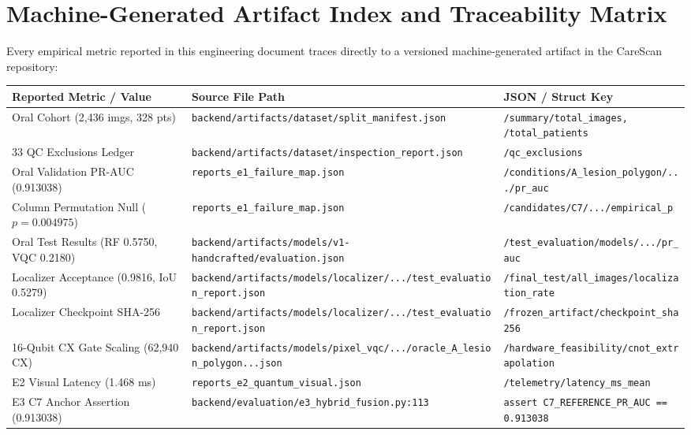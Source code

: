 \documentclass[11pt,a4paper]{report}
\newcommand{\artifact}[1]{\texttt{\footnotesize #1}}
\begin{document}
\chapter{Machine-Generated Artifact Index and Traceability Matrix}

Every empirical metric reported in this engineering document traces directly to a versioned machine-generated artifact in the CareScan repository:

\begin{table}[H]
\centering
\scriptsize
\begin{tabularx}{\textwidth}{llX}
\toprule
\textbf{Reported Metric / Value} & \textbf{Source File Path} & \textbf{JSON / Struct Key} \\
\midrule
Oral Cohort (2,436 imgs, 328 pts) & \artifact{backend/artifacts/dataset/split\_manifest.json} & \texttt{/summary/total\_images, /total\_patients} \\
33 QC Exclusions Ledger & \artifact{backend/artifacts/dataset/inspection\_report.json} & \texttt{/qc\_exclusions} \\
Oral Validation PR-AUC (0.913038) & \artifact{reports\_e1\_failure\_map.json} & \texttt{/conditions/A\_lesion\_polygon/.../pr\_auc} \\
Column Permutation Null ($p=0.004975$) & \artifact{reports\_e1\_failure\_map.json} & \texttt{/candidates/C7/.../empirical\_p} \\
Oral Test Results (RF 0.5750, VQC 0.2180) & \artifact{backend/artifacts/models/v1-handcrafted/evaluation.json} & \texttt{/test\_evaluation/models/.../pr\_auc} \\
Localizer Acceptance (0.9816, IoU 0.5279) & \artifact{backend/artifacts/models/localizer/.../test\_evaluation\_report.json} & \texttt{/final\_test/all\_images/localization\_rate} \\
Localizer Checkpoint SHA-256 & \artifact{backend/artifacts/models/localizer/.../test\_evaluation\_report.json} & \texttt{/frozen\_artifact/checkpoint\_sha256} \\
16-Qubit CX Gate Scaling (62,940 CX) & \artifact{backend/artifacts/models/pixel\_vqc/.../oracle\_A\_lesion\_polygon...json} & \texttt{/hardware\_feasibility/cnot\_extrapolation} \\
E2 Visual Latency (1.468 ms) & \artifact{reports\_e2\_quantum\_visual.json} & \texttt{/telemetry/latency\_ms\_mean} \\
E3 C7 Anchor Assertion (0.913038) & \artifact{backend/evaluation/e3\_hybrid\_fusion.py:113} & \texttt{assert C7\_REFERENCE\_PR\_AUC == 0.913038} \\

\end{tabularx}
\end{table}
\end{document}
